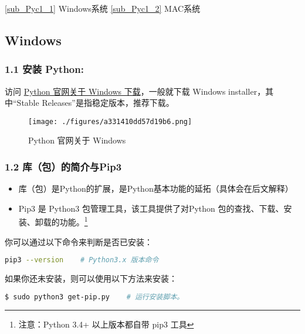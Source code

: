 
\autoref{sub_Pyc1_1} Windows系统
\autoref{sub_Pyc1_2} MAC系统


\subsection{Windows}\label{sub_Pyc1_1} 

\subsubsection{1.1 安装 Python:}
访问 \href{https://www.python.org/downloads/windows/}{Python 官网关于 Windows 下载}，一般就下载  Windows installer，其中“Stable Releases”是指稳定版本，推荐下载。
\begin{figure}[ht]
\centering
\texttt{[image: ./figures/a331410dd57d19b6.png]}
\caption{Python 官网关于 Windows} \label{fig_Python_1}
\end{figure}
\subsubsection{1.2 库（包）的简介与Pip3}

\begin{itemize}
\item 库（包）是Python的扩展，是Python基本功能的延拓（具体会在后文解释）
\item Pip3 是 Python3 包管理工具，该工具提供了对Python 包的查找、下载、安装、卸载的功能。\footnote{注意：Python 3.4+ 以上版本都自带 pip3 工具}
\end{itemize}

你可以通过以下命令来判断是否已安装：


\begin{lstlisting}[language=bash]
pip3 --version    # Python3.x 版本命令
\end{lstlisting}

如果你还未安装，则可以使用以下方法来安装：

\begin{lstlisting}[language=bash]
$ sudo python3 get-pip.py    # 运行安装脚本。
\end{lstlisting}


